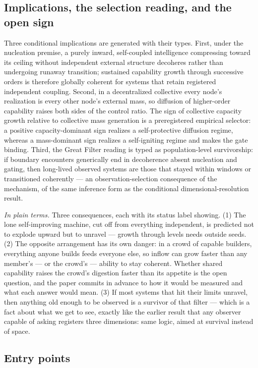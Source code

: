 \documentclass[11pt]{article}
\theoremstyle{definition}
\newcommand{\plainterms}{\emph{In plain terms.}}
\begin{document}
\subsection{Implications, the selection reading, and the open sign}

Three conditional implications are generated with their types. First, under the nucleation premise, a purely inward, self-coupled intelligence compressing toward its ceiling without independent external structure decoheres rather than undergoing runaway transition; sustained capability growth through successive orders is therefore globally coherent for systems that retain registered independent coupling. Second, in a decentralized collective every node's realization is every other node's external mass, so diffusion of higher-order capability raises both sides of the control ratio. The sign of collective capacity growth relative to collective mass generation is a preregistered empirical selector: a positive capacity-dominant sign realizes a self-protective diffusion regime, whereas a mass-dominant sign realizes a self-igniting regime and makes the gate binding. Third, the Great Filter reading is typed as population-level survivorship: if boundary encounters generically end in decoherence absent nucleation and gating, then long-lived observed systems are those that stayed within windows or transitioned coherently --- an observation-selection consequence of the mechanism, of the same inference form as the conditional dimensional-resolution result.

\noindent\plainterms{} Three consequences, each with its status label showing. (1) The lone self-improving machine, cut off from everything independent, is predicted not to explode upward but to unravel --- growth through levels needs outside seeds. (2) The opposite arrangement has its own danger: in a crowd of capable builders, everything anyone builds feeds everyone else, so inflow can grow faster than any member's --- or the crowd's --- ability to stay coherent. Whether shared capability raises the crowd's digestion faster than its appetite is the open question, and the paper commits in advance to how it would be measured and what each answer would mean. (3) If most systems that hit their limits unravel, then anything old enough to be observed is a survivor of that filter --- which is a fact about what we get to see, exactly like the earlier result that any observer capable of asking registers three dimensions: same logic, aimed at survival instead of space.

\subsection{Entry points}
\end{document}
